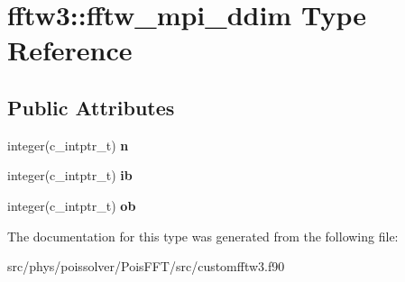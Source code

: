 \hypertarget{structfftw3_1_1fftw__mpi__ddim}{}\section{fftw3\+:\+:fftw\+\_\+mpi\+\_\+ddim Type Reference}
\label{structfftw3_1_1fftw__mpi__ddim}
\subsection*{Public Attributes}
\begin{DoxyCompactItemize}
\item 
integer(c\+\_\+intptr\+\_\+t) {\bfseries n}\hypertarget{structfftw3_1_1fftw__mpi__ddim_aeb5f0a8c18072866381be188331946d7}{}\label{structfftw3_1_1fftw__mpi__ddim_aeb5f0a8c18072866381be188331946d7}

\item 
integer(c\+\_\+intptr\+\_\+t) {\bfseries ib}\hypertarget{structfftw3_1_1fftw__mpi__ddim_a22b87594944b84a925fb6df8c94ead1b}{}\label{structfftw3_1_1fftw__mpi__ddim_a22b87594944b84a925fb6df8c94ead1b}

\item 
integer(c\+\_\+intptr\+\_\+t) {\bfseries ob}\hypertarget{structfftw3_1_1fftw__mpi__ddim_a1d1260a52e1adc192bc55eb1a4106eb2}{}\label{structfftw3_1_1fftw__mpi__ddim_a1d1260a52e1adc192bc55eb1a4106eb2}

\end{DoxyCompactItemize}


The documentation for this type was generated from the following file\+:\begin{DoxyCompactItemize}
\item 
src/phys/poissolver/\+Pois\+F\+F\+T/src/customfftw3.\+f90\end{DoxyCompactItemize}
